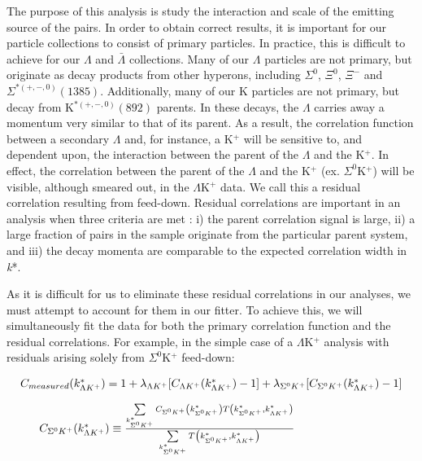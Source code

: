 \documentclass[ALICE,manyauthors]{cernphprep}
\begin{document}
The purpose of this analysis is study the interaction and scale of the emitting source of the pairs.
In order to obtain correct results, it is important for our particle collections to consist of primary particles.
In practice, this is difficult to achieve for our $\Lambda$ and $\bar{\Lambda}$ collections.
Many of our $\Lambda$ particles are not primary, but originate as decay products from other hyperons, including $\Sigma^{0}$, $\Xi^{0}$, $\Xi^{-}$ and $\Sigma^{*(+,-,0)}(1385)$.  Additionally, many of our K particles are not primary, but decay from K$^{*(+,-,0)}(892)$ parents.
In these decays, the $\Lambda$ carries away a momentum very similar to that of its parent.
As a result, the correlation function between a secondary $\Lambda$ and, for instance, a K$^{+}$  will be sensitive to, and dependent upon, the interaction between the parent of the $\Lambda$ and the K$^{+}$.
In effect, the correlation between the parent of the $\Lambda$ and the K$^{+}$ (ex. $\Sigma^{0}$K$^{+}$) will be visible, although smeared out, in the $\Lambda$K$^{+}$ data.
We call this a residual correlation resulting from feed-down.  Residual correlations are important in an analysis when three criteria are met \cite{Kisiel:2014mma}: i) the parent correlation signal is large, ii) a large fraction of pairs in the sample originate from the particular parent system, and iii) the decay momenta are comparable to the expected correlation width in \textit{k}*. 

As it is difficult for us to eliminate these residual correlations in our analyses, we must attempt to account for them in our fitter.
To achieve this, we will simultaneously fit the data for both the primary correlation function and the residual correlations.  For example, in the simple case of a $\Lambda$K$^{+}$ analysis with residuals arising solely from $\Sigma^{0}$K$^{+}$ feed-down:

\begin{equation}
\begin{array}{l}
\vspace{4mm}
 C_{measured}(k^{*}_{\Lambda K^{+}}) = 1 + \lambda_{\Lambda K^{+}}[C_{\Lambda K^{+}}(k^{*}_{\Lambda K^{+}})-1] + \lambda_{\Sigma^{0}K^{+}}[C_{\Sigma^{0}K^{+}}(k^{*}_{\Lambda K^{+}})-1] \\
\vspace{2mm}
  ~~~~~C_{\Sigma^{0}K^{+}}(k^{*}_{\Lambda K^{+}}) \equiv \frac{\sum\limits_{k^{*}_{\Sigma^{0}K^{+}}} C_{\Sigma^{0}K^{+}}\left(k^{*}_{\Sigma^{0}K^{+}}\right) T\left(k^{*}_{\Sigma^{0}K^{+}},k^{*}_{\Lambda K^{+}}\right)}{\sum\limits_{k^{*}_{\Sigma^{0}K^{+}}} T\left(k^{*}_{\Sigma^{0}K^{+}},k^{*}_{\Lambda K^{+}}\right)}
\end{array} 
\label{eqn:SimpleResiduals}
\end{equation}
\end{document}
